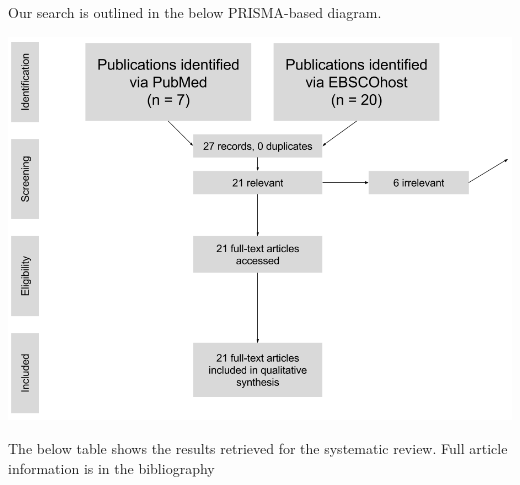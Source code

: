 \documentclass[]{elsarticle} %
\begin{document}
Our search is outlined in the below PRISMA-based diagram.

\begin{center}
\includegraphics[width=400pt]{img/prisma.png}
\end{center}

The below table shows the results retrieved for the systematic review.
Full article information is in the bibliography

\begingroup\fontsize{6pt}{7pt}\selectfont
\end{document}
